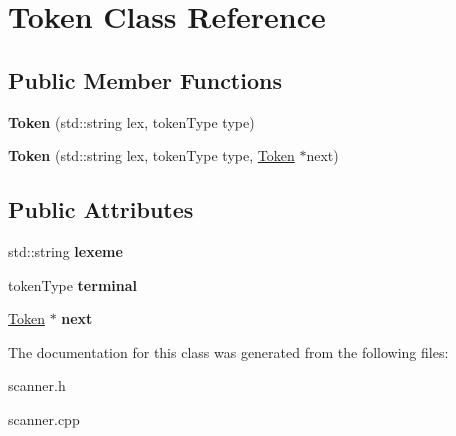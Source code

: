 \hypertarget{classToken}{\section{Token Class Reference}
\label{classToken}
}
\subsection*{Public Member Functions}
\begin{DoxyCompactItemize}
\item 
\hypertarget{classToken_a087251cfeb05246cc96c92880a3d80ad}{{\bfseries Token} (std\-::string lex, token\-Type type)}\label{classToken_a087251cfeb05246cc96c92880a3d80ad}

\item 
\hypertarget{classToken_a529e83dd830006aaa3a73369eba215d7}{{\bfseries Token} (std\-::string lex, token\-Type type, \hyperlink{classToken}{Token} $\ast$next)}\label{classToken_a529e83dd830006aaa3a73369eba215d7}

\end{DoxyCompactItemize}
\subsection*{Public Attributes}
\begin{DoxyCompactItemize}
\item 
\hypertarget{classToken_abbff29ede445ed4a8520580f12490832}{std\-::string {\bfseries lexeme}}\label{classToken_abbff29ede445ed4a8520580f12490832}

\item 
\hypertarget{classToken_a11b4722b5e4023d234d2017126de378b}{token\-Type {\bfseries terminal}}\label{classToken_a11b4722b5e4023d234d2017126de378b}

\item 
\hypertarget{classToken_a32f24a25af788c192e5b387dc8d67914}{\hyperlink{classToken}{Token} $\ast$ {\bfseries next}}\label{classToken_a32f24a25af788c192e5b387dc8d67914}

\end{DoxyCompactItemize}


The documentation for this class was generated from the following files\-:\begin{DoxyCompactItemize}
\item 
scanner.\-h\item 
scanner.\-cpp\end{DoxyCompactItemize}
